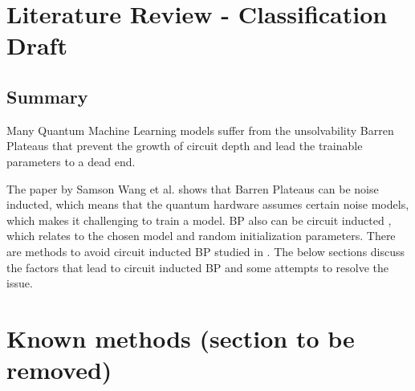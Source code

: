 \section{Literature Review - Classification Draft}

\subsection{Summary}

Many Quantum Machine Learning models suffer from the unsolvability Barren Plateaus \cite{zhaoReviewQuantumNeural2021} that prevent the growth of circuit depth and lead the trainable parameters to a dead end.

The paper \cite{wangNoiseinducedBarrenPlateaus2021} by Samson Wang et al. shows that Barren Plateaus can be noise inducted, which means that the quantum hardware assumes certain noise models, which makes it challenging to train a model. 
BP also can be circuit inducted \cite{mccleanBarrenPlateausQuantum2018}, which relates to the chosen model and random initialization parameters.
There are methods to avoid circuit inducted BP studied in \cite{pesahAbsenceBarrenPlateaus2021, cerezoCostFunctionDependent2021,skolikLayerwiseLearningQuantum2021}.
The below sections discuss the factors that lead to circuit inducted BP and some attempts to resolve the issue.







\vspace{60pt}
\section{Known methods (section to be removed)}





